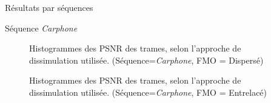 \begin{section}{Résultats par séquences}
\begin{subsection}{Séquence \textit{Carphone}}
\begin{figure} 
\caption[]{Histogrammes des PSNR des trames, selon l'approche de dissimulation
utilisée. (Séquence=\textit{Carphone}, FMO = Dispersé)}
\label{fig-ParSequenceDispersed4}
\end{figure}

\begin{figure} 
\caption[]{Histogrammes des PSNR des trames, selon l'approche de dissimulation
utilisée. (Séquence=\textit{Carphone}, FMO = Entrelacé)}
\label{fig-ParSequenceInterleaved4}
\end{figure}

\FloatBarrier
\end{subsection}


\end{section}
